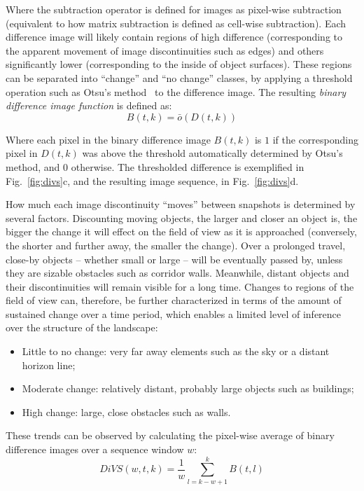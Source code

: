 \documentclass[twocolumn, 9pt,fleqn]{jsproceedings}
\begin{document}
Where the subtraction operator is defined for images as pixel-wise subtraction (equivalent to how matrix subtraction is defined as cell-wise subtraction). Each difference image will likely contain regions of high difference (corresponding to the apparent movement of image discontinuities such as edges) and others significantly lower (corresponding to the inside of object surfaces). These regions can be separated into ``change'' and ``no change'' classes, by applying a threshold operation such as Otsu's method~\cite{OTS79} to the difference image. The resulting \textit{binary difference image function} is defined as:
\begin{equation}
B(t, k) = \bar{o}(D(t, k))
\end{equation}

Where each pixel in the binary difference image $B(t, k)$ is $1$ if the corresponding pixel in $D(t, k)$ was above the threshold automatically determined by Otsu's method, and $0$ otherwise. The thresholded difference is exemplified in Fig.~\ref{fig:divs}c, and the resulting image sequence, in Fig.~\ref{fig:divs}d.

How much each image discontinuity ``moves'' between snapshots is determined by several factors. Discounting moving objects, the larger and closer an object is, the bigger the change it will effect on the field of view as it is approached (conversely, the shorter and further away, the smaller the change). Over a prolonged travel, close-by objects -- whether small or large -- will be eventually passed by, unless they are sizable obstacles such as corridor walls. Meanwhile, distant objects and their discontinuities will remain visible for a long time. Changes to regions of the field of view can, therefore, be further characterized in terms of the amount of sustained change over a time period, which enables a limited level of inference over the structure of the landscape:

\begin{itemize}
\item Little to no change: very far away elements such as the sky or a distant horizon line;
\item Moderate change: relatively distant, probably large objects such as buildings;
\item High change: large, close obstacles such as walls.
\end{itemize}

These trends can be observed by calculating the pixel-wise average of binary difference images over a sequence window $w$:
\begin{equation}
DiVS(w, t, k) = \frac{1}{w} \sum_{l=k-w+1}^{k}{B(t, l)}
\end{equation}
\end{document}

